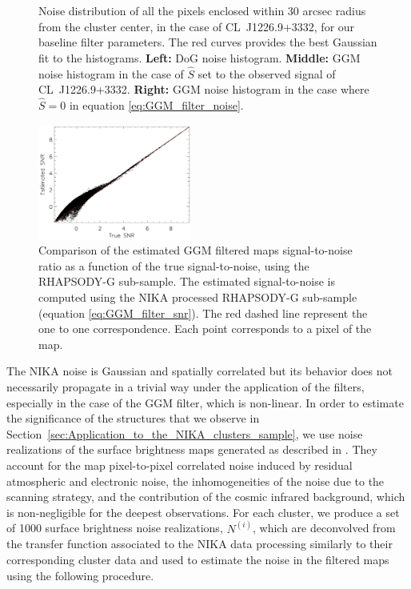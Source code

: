 \documentclass[twocolumn,traditabstract]{aa}
\begin{document}
\begin{figure}[h]
\caption{\footnotesize{Noise distribution of all the pixels enclosed within 30 arcsec radius from the cluster center, in the case of \mbox{CL~J1226.9+3332}, for our baseline filter parameters. The red curves provides the best Gaussian fit to the histograms. {\bf Left:} DoG noise histogram. {\bf Middle:} GGM noise histogram in the case of $\hat{S}$ set to the observed signal of \mbox{CL~J1226.9+3332}. {\bf Right:} GGM noise histogram in the case where $\hat{S} = 0$ in equation \ref{eq:GGM_filter_noise}.}}
\label{fig:noise_statistics1}
\end{figure}

\begin{figure}[h]
\centering
\includegraphics[width=0.45\textwidth]{Figure/Conta_noise_Grad_SNRtrueVSmeasRG377_00181_Ymap_zobs0p5_15_15_45.pdf}
\caption{\footnotesize{Comparison of the estimated GGM filtered maps signal-to-noise ratio as a function of the true signal-to-noise, using the RHAPSODY-G sub-sample. The estimated signal-to-noise is computed using the NIKA processed RHAPSODY-G sub-sample (equation \ref{eq:GGM_filter_snr}). The red dashed line represent the one to one correspondence. Each point corresponds to a pixel of the map.}}
\label{fig:noise_statistics2}
\end{figure}

The NIKA noise is Gaussian and spatially correlated \citep{Adam2016a} but its behavior does not necessarily propagate in a trivial way under the application of the filters, especially in the case of the GGM filter, which is non-linear. In order to estimate the significance of the structures that we observe in Section~\ref{sec:Application_to_the_NIKA_clusters_sample}, we use noise realizations of the surface brightness maps generated as described in \cite{Adam2016a}. They account for the map pixel-to-pixel correlated noise induced by residual atmospheric and electronic noise, the inhomogeneities of the noise due to the scanning strategy, and the contribution of the cosmic infrared background, which is non-negligible for the deepest observations. For each cluster, we produce a set of 1000 surface brightness noise realizations, $N^{(i)}$, which are deconvolved from the transfer function associated to the NIKA data processing similarly to their corresponding cluster data and used to estimate the noise in the filtered maps using the following procedure. 
\end{document}
